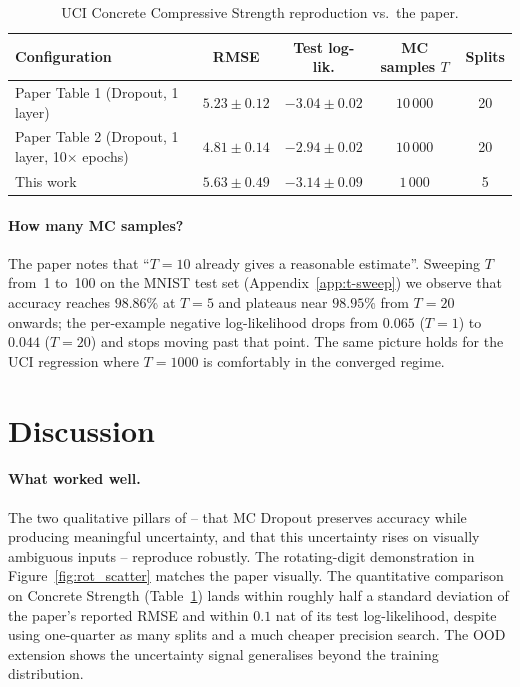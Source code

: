 \documentclass{article}
\begin{document}
\begin{table}[t]
\centering
\caption{UCI Concrete Compressive Strength reproduction vs.\ the paper.}
\label{tab:uci}
\small
\begin{tabular}{lcccc}
\toprule
Configuration & RMSE & Test log-lik. & MC samples $T$ & Splits \\
\midrule
Paper Table 1 (Dropout, 1 layer)                 & $5.23\pm 0.12$ & $-3.04\pm 0.02$ & $10\,000$ & 20 \\
Paper Table 2 (Dropout, 1 layer, 10$\times$ epochs) & $4.81\pm 0.14$ & $-2.94\pm 0.02$ & $10\,000$ & 20 \\
This work                                         & $5.63\pm 0.49$ & $-3.14\pm 0.09$ & $1\,000$  & 5 \\
\bottomrule
\end{tabular}
\end{table}

\paragraph{How many MC samples?} The paper notes that ``$T=10$ already gives a reasonable estimate''. Sweeping $T$ from~1 to~100 on the MNIST test set (Appendix~\ref{app:t-sweep}) we observe that accuracy reaches $98.86\%$ at $T=5$ and plateaus near $98.95\%$ from $T=20$ onwards; the per-example negative log-likelihood drops from $0.065$ ($T=1$) to $0.044$ ($T=20$) and stops moving past that point. The same picture holds for the UCI regression where $T=1000$ is comfortably in the converged regime.

\section{Discussion}

\paragraph{What worked well.} The two qualitative pillars of \citet{gal2016dropout} -- that MC Dropout preserves accuracy while producing meaningful uncertainty, and that this uncertainty rises on visually ambiguous inputs -- reproduce robustly. The rotating-digit demonstration in Figure~\ref{fig:rot_scatter} matches the paper visually. The quantitative comparison on Concrete Strength (Table~\ref{tab:uci}) lands within roughly half a standard deviation of the paper's reported RMSE and within $0.1$ nat of its test log-likelihood, despite using one-quarter as many splits and a much cheaper precision search. The OOD extension shows the uncertainty signal generalises beyond the training distribution.
\end{document}
